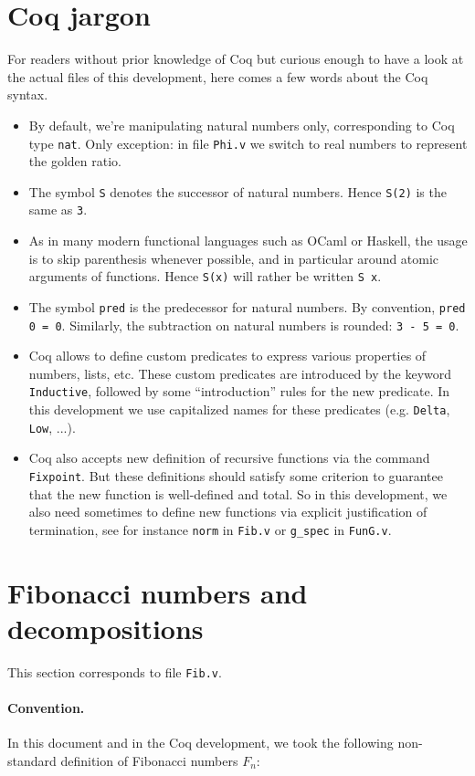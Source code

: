 \documentclass[a4paper,11pt]{article}
\begin{document}
\section{Coq jargon}
For readers without prior knowledge
of Coq but curious enough to have a look at the actual files
of this development, here comes a few words about the Coq syntax.
\begin{itemize}
\item By default, we're manipulating natural numbers only, corresponding
 to Coq type {\tt nat}. Only exception: in file {\tt Phi.v}
 we switch to real numbers to represent the golden ratio.
\item The symbol {\tt S} denotes the successor of natural numbers.
  Hence {\tt S(2)} is the same as {\tt 3}.
\item As in many modern functional languages such as OCaml or Haskell,
  the usage is to skip parenthesis whenever possible, and
  in particular around atomic arguments of functions. Hence
  {\tt S(x)} will rather be written {\tt S x}.
\item The symbol {\tt pred} is the predecessor for natural numbers.
  By convention, {\tt pred 0 = 0}. Similarly, the subtraction on
  natural numbers is rounded: {\tt 3 - 5 = 0}.
\item Coq allows to define custom predicates to express various
  properties of numbers, lists, etc. These custom predicates are
  introduced by the keyword {\tt Inductive}, followed by some
  ``introduction'' rules for the new predicate. In this development
  we use capitalized names for these predicates (e.g. {\tt Delta},
  {\tt Low}, ...).
\item Coq also accepts new definition of recursive functions via
  the command {\tt Fixpoint}. But these definitions should satisfy
  some criterion to guarantee that the new function is well-defined
  and total. So in this development, we also need sometimes to
  define new functions via explicit justification of termination,
  see for instance {\tt norm} in {\tt Fib.v} or {\tt g\_spec} in {\tt FunG.v}.
\end{itemize}

\section{Fibonacci numbers and decompositions}

This section corresponds to file {\tt Fib.v}.

\paragraph{Convention.} In this document and in the Coq development,
we took the following non-standard definition of Fibonacci numbers
$F_n$:
\end{document}
